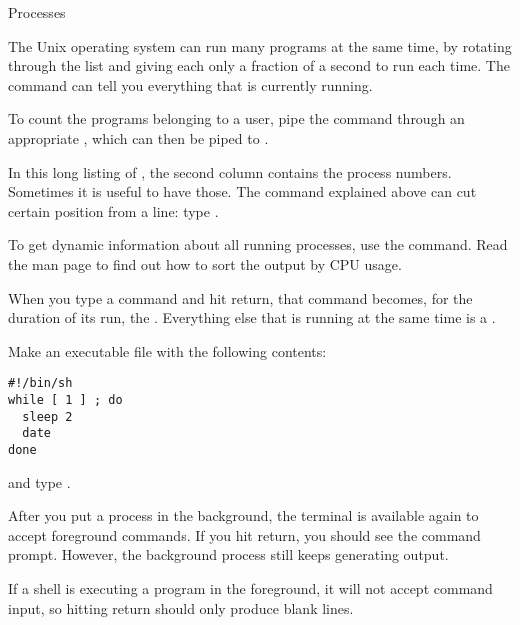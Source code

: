  {Processes}

The Unix operating system can run many programs at the same time, by
rotating through
the list and giving each only a  fraction of a second to run each time.
The command  can tell you everything that is currently running.

{To count the programs belonging to a user, pipe the  command
  through an appropriate , which can then be piped to .}
{}

In this long listing of , the second column contains the process
numbers. Sometimes it is useful to have those. The  command
explained above can
cut certain position from a line: type .

To get dynamic information about all running processes, use the
 command. Read the man page to find out how to sort the output
by CPU usage.

When you type a command and hit return, that command becomes, for
the duration of its run, the . Everything else that is running at the same time is a
.

Make an executable file  with the following contents:
\begin{verbatim}
#!/bin/sh
while [ 1 ] ; do
  sleep 2
  date
done
\end{verbatim}
and type . 

{After you put a process in the background, the terminal is available
  again to accept foreground commands. If you hit return, you should
  see the command prompt. However, the background process still keeps
  generating output.}{}

{If a shell is executing a program in the foreground, it will not
  accept command input, so hitting return should only produce blank
  lines.}{}

